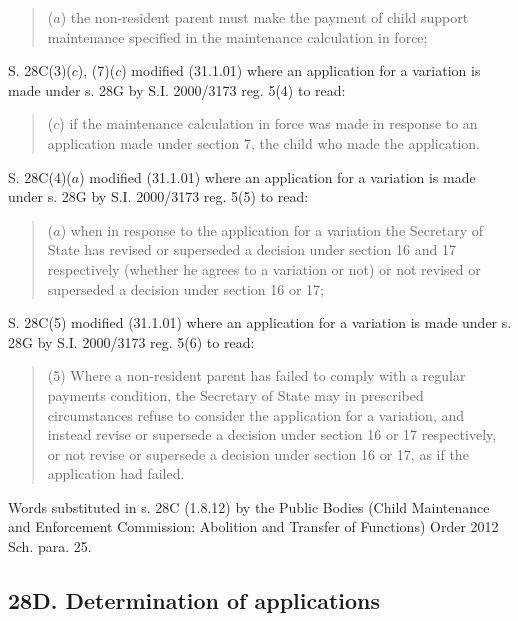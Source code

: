 \documentclass[a4paper]{article}
\begin{document}
{{\begin{quotation}
($a$) the non-resident parent must make the payment of
child support maintenance specified in the
maintenance calculation in force;
\end{quotation}

S. 28C(3)($c$), (7)($c$) modified (31.1.01) where an application for a variation is made under s. 28G by S.I. 2000/3173 reg. 5(4) to read:

\begin{quotation}
($c$) if the maintenance calculation in force was made
in response to an application made under section
7, the child who made the application.
\end{quotation}

S. 28C(4)($a$) modified (31.1.01) where an application for a variation is made under s. 28G by S.I. 2000/3173 reg. 5(5) to read:

\begin{quotation}
($a$) when in response to the application for a variation the Secretary of State has revised or superseded a decision under section 16 and 17 respectively (whether he agrees to a variation or not) or not revised or superseded a decision under section 16 or 17;
\end{quotation}

S. 28C(5) modified (31.1.01) where an application for a variation is made under s. 28G by S.I. 2000/3173 reg. 5(6) to read:

\begin{quotation}
(5) Where a non-resident parent has failed to comply with a regular payments condition, the Secretary of State may in prescribed circumstances refuse to consider the application for a variation, and instead revise or supersede a decision under section 16 or 17 respectively, or not revise or supersede a decision under section 16 or 17, as if the application had
failed.
\end{quotation}

Words substituted in s. 28C (1.8.12) by the Public Bodies (Child Maintenance and Enforcement Commission: Abolition and Transfer of Functions) Order 2012 Sch. para. 25.
}
}

\subsection{28D. Determination of applications}

\end{document}
